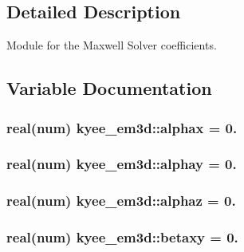 \subsection{Detailed Description}
Module for the Maxwell Solver coefficients. 

\subsection{Variable Documentation}
\subsubsection[{\texorpdfstring{alphax}{alphax}}]{\setlength{\rightskip}{0pt plus 5cm}real(num) kyee\+\_\+em3d\+::alphax = 0.}\hypertarget{namespacekyee__em3d_ac2a66c5c8d30bf6b7b48aea0657bf8bc}{}\label{namespacekyee__em3d_ac2a66c5c8d30bf6b7b48aea0657bf8bc}
\subsubsection[{\texorpdfstring{alphay}{alphay}}]{\setlength{\rightskip}{0pt plus 5cm}real(num) kyee\+\_\+em3d\+::alphay = 0.}\hypertarget{namespacekyee__em3d_aa2267c9b11a659a0462bfece7c0c2916}{}\label{namespacekyee__em3d_aa2267c9b11a659a0462bfece7c0c2916}
\subsubsection[{\texorpdfstring{alphaz}{alphaz}}]{\setlength{\rightskip}{0pt plus 5cm}real(num) kyee\+\_\+em3d\+::alphaz = 0.}\hypertarget{namespacekyee__em3d_a47e844c257f4e614390c7ca29cce5f2c}{}\label{namespacekyee__em3d_a47e844c257f4e614390c7ca29cce5f2c}
\subsubsection[{\texorpdfstring{betaxy}{betaxy}}]{\setlength{\rightskip}{0pt plus 5cm}real(num) kyee\+\_\+em3d\+::betaxy = 0.}\hypertarget{namespacekyee__em3d_ae8a174dcda1cd460d69a96037af08fd2}{}\label{namespacekyee__em3d_ae8a174dcda1cd460d69a96037af08fd2}
